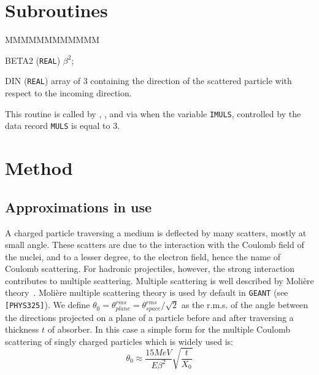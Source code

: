   
\section{Subroutines}


\begin{DLtt}{MMMMMMMMMMMM}
\item[BETA2] ({\tt REAL}) $\beta^2$;
\item[DIN]  ({\tt REAL}) array of 3 containing the 
direction of the scattered particle with respect to the
incoming direction.
\end{DLtt}
This routine is called by , ,
 and  via
 when the variable {\tt IMULS},
controlled by the data record {\tt MULS} is equal to 3.

\section{Method}

\subsection{Approximations in use}
 
A charged particle traversing a medium is deflected by many
scatters, mostly at small angle. These scatters are due to
the interaction with the Coulomb field of the nuclei, and
to a lesser degree, to the electron field, hence the name
of Coulomb scattering. For hadronic projectiles, however,
the strong interaction contributes to multiple scattering.
Multiple scattering is well described by Moli\`{e}re
theory~\cite{bib-BET1}.
Moli\`{e}re multiple scattering theory is used by default
in {\tt GEANT} (see {\tt [PHYS325]}). 
We define $\theta_0 = \theta^{rms}_{plane} = 
\theta^{rms}_{space}/\sqrt{2}$ as the r.m.s. of the angle between the
directions projected on a plane 
of a particle before and after traversing a thickness $t$
of absorber. In this case a simple form for the multiple Coulomb
scattering of singly charged particles which is widely used is:
\[
\theta_0 \approx \frac{15 MeV}{E \beta^2} \sqrt{\frac{t}{X_0}}
\]

